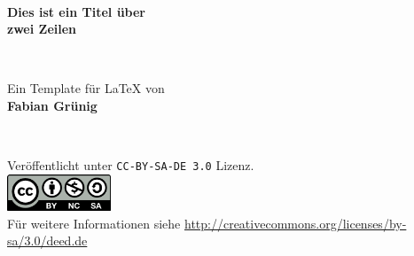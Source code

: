 
\begin{titlepage}

~

\begin{center}
  {\Huge \textbf{Dies ist ein Titel über \\[1em] zwei Zeilen}}
\end{center}

~\vspace{2em}~

\begin{center}
  \begin{center}
    Ein Template für \LaTeX{} von\\[0.5ex]
    \textbf{Fabian Grünig}
  \end{center}
\end{center}

~\vfill~

\begin{center}
Veröffentlicht unter \texttt{CC-BY-SA-DE 3.0} Lizenz.
\vspace{0.5cm}\\
  \includegraphics[height=31pt,width=88pt]{material/license.pdf}
\vspace{0.5cm}\\
Für weitere Informationen siehe
\url{http://creativecommons.org/licenses/by-sa/3.0/deed.de}
\end{center}

\end{titlepage}

